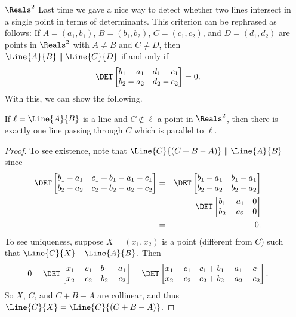\documentclass{article}
\begin{document}
\begin{itemize}
\item[$\Reals^2$] Last time we gave a nice way to detect whether two lines intersect in a single point in terms of determinants. This criterion can be rephrased as follows: If $A = (a_1, b_1)$, $B = (b_1, b_2)$, $C = (c_1, c_2)$, and $D = (d_1, d_2)$ are points in $\Reals^2$ with $A \neq B$ and $C \neq D$, then $\Line{A}{B} \parallel \Line{C}{D}$ if and only if \[ \DET \begin{bmatrix} b_1 - a_1 & d_1 - c_1 \\ b_2 - a_2 & d_2 - c_2 \end{bmatrix} = 0. \] With this, we can show the following.

\begin{prop}
If $\ell = \Line{A}{B}$ is a line and $C \notin \ell$ a point in $\Reals^2$, then there is exactly one line passing through $C$ which is parallel to $\ell$.
\end{prop}

\begin{proof}
To see existence, note that $\Line{C}{(C+B-A)} \parallel \Line{A}{B}$ since
\begin{eqnarray*}
\DET \begin{bmatrix} b_1 - a_1 & c_1 + b_1 - a_1 - c_1 \\ b_2 - a_2 & c_2 + b_2 - a_2 - c_2 \end{bmatrix}
 & = & \DET \begin{bmatrix} b_1 - a_1 & b_1 - a_1 \\ b_2 - a_2 & b_2 - a_2 \end{bmatrix} \\
 & = & \DET \begin{bmatrix} b_1 - a_1 & 0 \\ b_2 - a_2 & 0 \end{bmatrix} \\
 & = & 0.
\end{eqnarray*}
To see uniqueness, suppose $X = (x_1, x_2)$ is a point (different from $C$) such that $\Line{C}{X} \parallel \Line{A}{B}$. Then \[ 0 = \DET \begin{bmatrix} x_1 - c_1 & b_1 - a_1 \\ x_2 - c_2 & b_2 - c_2 \end{bmatrix} = \DET \begin{bmatrix} x_1 - c_1 & c_1 + b_1 - a_1 - c_1 \\ x_2 - c_2 & c_2 + b_2 - a_2 - c_2 \end{bmatrix}. \] So $X$, $C$, and $C+B-A$ are collinear, and thus $\Line{C}{X} = \Line{C}{(C+B-A)}$.
\end{proof}


\end{itemize}
\end{document}
